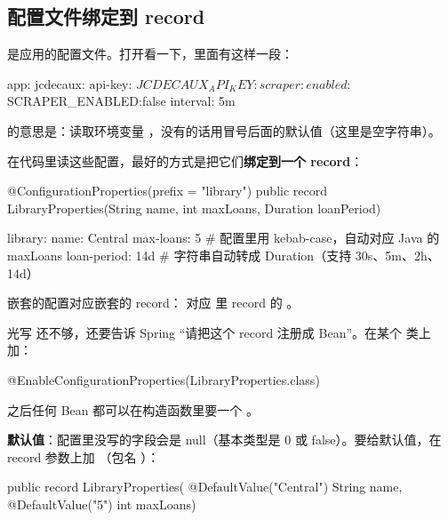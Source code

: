\subsection{配置文件绑定到 record}

 是应用的配置文件。打开看一下，里面有这样一段：

\begin{yamlcode}
app:
  jcdecaux:
    api-key: ${JCDECAUX_API_KEY:}
  scraper:
    enabled: ${SCRAPER_ENABLED:false}
    interval: 5m
\end{yamlcode}

 的意思是：读取环境变量 ，没有的话用冒号后面的默认值（这里是空字符串）。

在代码里读这些配置，最好的方式是把它们\textbf{绑定到一个 record}：

\begin{java}
@ConfigurationProperties(prefix = "library")
public record LibraryProperties(String name, int maxLoans, Duration loanPeriod) {}
\end{java}

\begin{yamlcode}
library:
  name: Central
  max-loans: 5          # 配置里用 kebab-case，自动对应 Java 的 maxLoans
  loan-period: 14d      # 字符串自动转成 Duration（支持 30s、5m、2h、14d）
\end{yamlcode}

嵌套的配置对应嵌套的 record： 对应  里  record 的 。

光写  还不够，还要告诉 Spring “请把这个 record 注册成 Bean”。在某个  类上加：

\begin{java}
@EnableConfigurationProperties(LibraryProperties.class)
\end{java}

之后任何 Bean 都可以在构造函数里要一个 。

\textbf{默认值}：配置里没写的字段会是 null（基本类型是 0 或 false）。要给默认值，在 record 参数上加 （包名 ）：

\begin{java}
public record LibraryProperties(
        @DefaultValue("Central") String name,
        @DefaultValue("5") int maxLoans) {}
\end{java}

